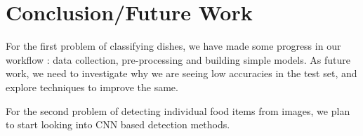\section{Conclusion/Future Work}

For the first problem of classifying dishes, we have made some progress in our workflow : data collection, pre-processing and building simple models. As future work, we need to investigate why we are seeing low accuracies in the test set, and explore techniques to improve the same.

For the second problem of detecting individual food items from images, we plan to start looking into CNN based detection methods.